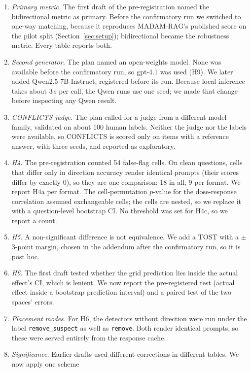 \begin{enumerate}[leftmargin=*,itemsep=1pt,topsep=2pt]
\item \emph{Primary metric.} The first draft of the pre-registration named the bidirectional metric as primary. Before
the confirmatory run we switched to one-way matching, because it reproduces MADAM-RAG's published score on the pilot
split (Section~\ref{sec:setup}); bidirectional became the robustness metric. Every table reports both.
\item \emph{Second generator.} The plan named an open-weights model. None was available before the confirmatory run, so
gpt-4.1 was used (H9). We later added Qwen2.5-7B-Instruct, registered before its run. Because local inference
takes about 3\,s per call, the Qwen runs use one seed; we made that change before inspecting any Qwen result.
\item \emph{CONFLICTS judge.} The plan called for a judge from a different model family, validated on about 100 human
labels. Neither the judge nor the labels were available, so CONFLICTS is scored only on items with a reference answer,
with three seeds, and reported as exploratory.
\item \emph{H4.} The pre-registration counted 54 false-flag cells. On clean questions, cells that differ only in
direction accuracy render identical prompts (their scores differ by exactly 0), so they are one comparison: 18 in
all, 9 per format. We report H4a per format. The cell-permutation $p$-value for the dose-response correlation assumed
exchangeable cells; the cells are nested, so we replace it with a question-level bootstrap CI. No threshold was set
for H4c, so we report a count.
\item \emph{H5.} A non-significant difference is not equivalence. We add a TOST with a $\pm$3-point margin, chosen in
the addendum after the confirmatory run, so it is post hoc.
\item \emph{H6.} The first draft tested whether the grid prediction lies inside the actual effect's CI, which is
lenient. We now report the pre-registered test (actual effect inside a bootstrap prediction interval) and a paired test
of the two spaces' errors.
\item \emph{Placement modes.} For H6, the detectors without direction were run under the label
\texttt{remove\_suspect} as well as \texttt{remove}. Both render identical prompts, so these were served entirely from
the response cache.
\item \emph{Significance.} Earlier drafts used different corrections in different tables. We now apply one scheme

\end{enumerate}
